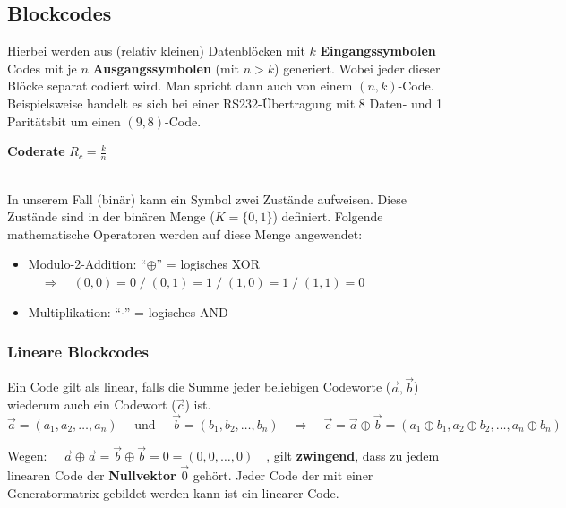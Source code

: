 \subsection{Blockcodes }
Hierbei werden aus (relativ kleinen) Datenblöcken mit \boldmath$k$ \textbf{Eingangssymbolen} Codes mit
je $n$ \unboldmath \textbf{Ausgangssymbolen} (mit $n > k$) generiert. Wobei jeder dieser Blöcke
separat codiert wird. Man spricht dann auch von einem $(n,k)$-Code. Beispielsweise handelt es
sich bei einer RS232-Übertragung mit 8 Daten- und 1 Paritätsbit um einen $(9,8)$-Code. \\
\hspace*{0.5cm} \parbox[c][1cm]{5cm}{\textbf{Coderate} $R_c = \frac{k}{n}$}\\
In unserem Fall (binär) kann ein Symbol zwei Zustände aufweisen. Diese Zustände sind in der binären
Menge ($K=\{0,1\}$) definiert.
Folgende mathematische Operatoren werden auf diese Menge angewendet:
\begin{itemize}
  \item Modulo-2-Addition: ``$\oplus$'' = logisches XOR $\quad\Rightarrow
  \quad(0,0)=0\;/\;(0,1)=1\;/\;(1,0)=1\;/\;(1,1)=0$
  \item Multiplikation: ``$\cdot$'' = logisches AND
\end{itemize}


\subsubsection{Lineare Blockcodes}
Ein Code gilt als linear, falls die Summe jeder beliebigen Codeworte ($\vec{a},\vec{b}$) wiederum auch ein
Codewort ($\vec{c}$) ist. 
$$\vec{a} = (a_1, a_2, \ldots, a_n) \quad \text{ und } \quad \vec{b} = (b_1, b_2, \ldots, b_n) \quad
\Longrightarrow \quad \vec{c} = \vec{a} \oplus \vec{b} = (a_1 \oplus b_1, a_2 \oplus b_2, \ldots, a_n \oplus b_n)$$

Wegen: $\quad \vec{a} \oplus \vec{a} = \vec{b} \oplus \vec{b} = 0 = (0,0,\ldots,0) \quad$, gilt \textbf{zwingend}, dass
zu jedem linearen Code der \textbf{Nullvektor} $\vec{0}$ gehört. Jeder Code der mit einer Generatormatrix
gebildet werden kann ist ein linearer Code.


